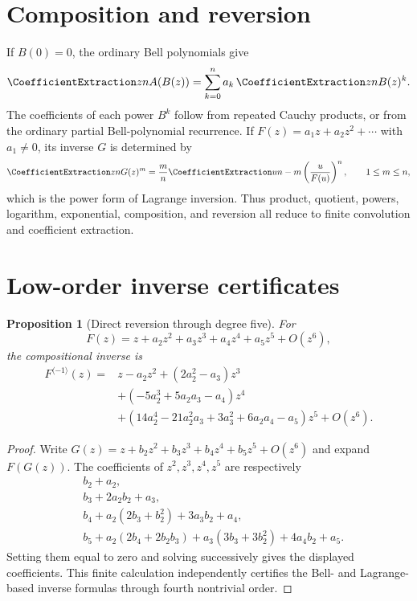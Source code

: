 \documentclass[11pt,a4paper,oneside,openany]{book}
\newtheorem{proposition}[theorem]{Proposition}
\theoremstyle{definition}
\theoremstyle{remark}
\begin{document}
\section{Composition and reversion}

If $B(0)=0$, the ordinary Bell polynomials give
\begin{equation}\label{eq:new-ordinary-composition-algorithm}
 \CoefficientExtraction z n A(B(z))
 =\sum_{k=0}^n a_k\,\CoefficientExtraction z n B(z)^k.
\end{equation}
The coefficients of each power $B^k$ follow from repeated Cauchy products, or
from the ordinary partial Bell-polynomial recurrence.  If
$F(z)=a_1z+a_2z^2+\cdots$ with $a_1\ne0$, its inverse $G$ is determined by
\begin{equation}\label{eq:new-reversion-algorithm}
 \CoefficientExtraction z n G(z)^m
 =\frac{m}{n}\CoefficientExtraction u{n-m}\left(\frac{u}{F(u)}\right)^n,
 \qquad 1\le m\le n,
\end{equation}
which is the power form of Lagrange inversion.  Thus product, quotient,
powers, logarithm, exponential, composition, and reversion all reduce to
finite convolution and coefficient extraction.

\section{Low-order inverse certificates}

\begin{proposition}[Direct reversion through degree five]\label{prop:new-low-order-reversion}
For
\[
 F(z)=z+a_2z^2+a_3z^3+a_4z^4+a_5z^5+O(z^6),
\]
the compositional inverse is
\begin{align*}
 F^{\langle-1\rangle}(z)
={}&z-a_2z^2+(2a_2^2-a_3)z^3\\
 &+(-5a_2^3+5a_2a_3-a_4)z^4\\
 &+(14a_2^4-21a_2^2a_3+3a_3^2+6a_2a_4-a_5)z^5
 +O(z^6).
\end{align*}
\end{proposition}

\begin{proof}
Write $G(z)=z+b_2z^2+b_3z^3+b_4z^4+b_5z^5+O(z^6)$ and expand
$F(G(z))$.  The coefficients of $z^2,z^3,z^4,z^5$ are respectively
\begin{align*}
 &b_2+a_2,\\
 &b_3+2a_2b_2+a_3,\\
 &b_4+a_2(2b_3+b_2^2)+3a_3b_2+a_4,\\
 &b_5+a_2(2b_4+2b_2b_3)
   +a_3(3b_3+3b_2^2)+4a_4b_2+a_5.
\end{align*}
Setting them equal to zero and solving successively gives the displayed
coefficients.  This finite calculation independently certifies the Bell- and
Lagrange-based inverse formulas through fourth nontrivial order.
\end{proof}
\end{document}
